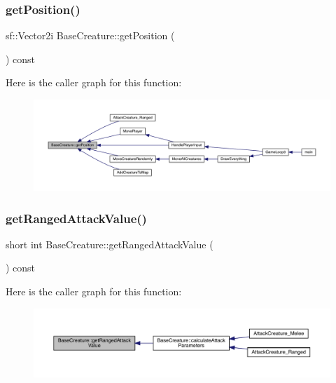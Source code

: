 \subsubsection{\texorpdfstring{get\+Position()}{getPosition()}}
{\footnotesize\ttfamily sf\+::\+Vector2i Base\+Creature\+::get\+Position (\begin{DoxyParamCaption}{ }\end{DoxyParamCaption}) const}

Here is the caller graph for this function\+:
\nopagebreak
\begin{figure}[H]
\begin{center}
\leavevmode
\includegraphics[width=350pt]{d2/d3b/class_base_creature_a00ebdc186dd6d3c0ef3c3d1262d4363f_icgraph}
\end{center}
\end{figure}
\mbox{\label{class_base_creature_a58a174420d25df7d0865087586c66a21}} 
\subsubsection{\texorpdfstring{get\+Ranged\+Attack\+Value()}{getRangedAttackValue()}}
{\footnotesize\ttfamily short int Base\+Creature\+::get\+Ranged\+Attack\+Value (\begin{DoxyParamCaption}{ }\end{DoxyParamCaption}) const}

Here is the caller graph for this function\+:
\nopagebreak
\begin{figure}[H]
\begin{center}
\leavevmode
\includegraphics[width=350pt]{d2/d3b/class_base_creature_a58a174420d25df7d0865087586c66a21_icgraph}
\end{center}
\end{figure}
\mbox{\label{class_base_creature_a1232a2ecb3199fe79627df912078f24e}} 
